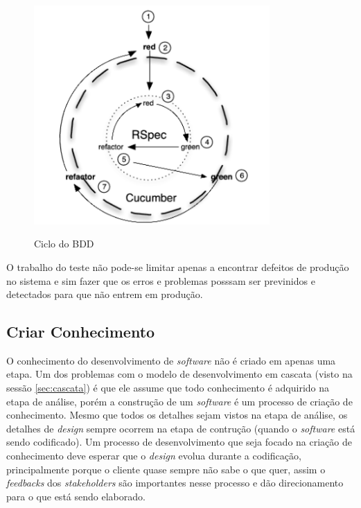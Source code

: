 \begin{figure}[htb!]
\begin{center}
\caption{Ciclo do BDD}
\label{fig:bdd}
\includegraphics[width=9cm]{assets/bdd} \\
\end{center}
\end{figure}	

O trabalho do teste não pode-se limitar apenas a encontrar defeitos de produção no sistema e sim fazer  que os erros e problemas posssam ser previnidos e detectados para que não entrem em produção.

\subsection{Criar Conhecimento}

O conhecimento do desenvolvimento de \textit{software} não é criado em apenas uma etapa. Um dos problemas com o modelo de desenvolvimento em cascata (visto na sessão \ref{sec:cascata}) é que ele assume que todo conhecimento é adquirido na etapa de análise, porém a construção de um \textit{software} é um processo de criação de conhecimento. Mesmo que todos os detalhes sejam vistos na etapa de análise, os detalhes de \textit{design} sempre ocorrem na etapa de contrução (quando o \textit{software} está sendo codificado). Um processo de desenvolvimento que seja focado na criação de conhecimento deve esperar que o \textit{design} evolua durante a codificação, principalmente porque o cliente quase sempre não sabe o que quer, assim o \textit{feedbacks} dos \textit{stakeholders} são importantes nesse processo e dão direcionamento para o que está sendo elaborado.

